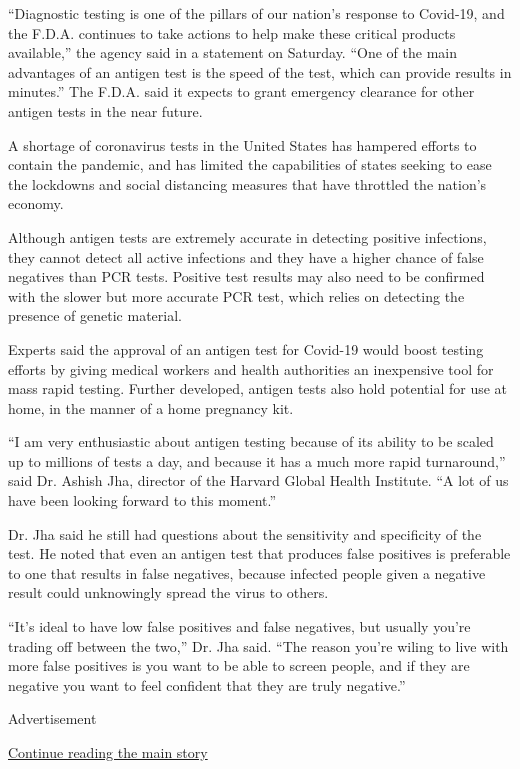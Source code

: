 ``Diagnostic testing is one of the pillars of our nation's response to
Covid-19, and the F.D.A. continues to take actions to help make these
critical products available,'' the agency said in a statement on
Saturday. ``One of the main advantages of an antigen test is the speed
of the test, which can provide results in minutes.'' The F.D.A. said it
expects to grant emergency clearance for other antigen tests in the near
future.

A shortage of coronavirus tests in the United States has hampered
efforts to contain the pandemic, and has limited the capabilities of
states seeking to ease the lockdowns and social distancing measures that
have throttled the nation's economy.

Although antigen tests are extremely accurate in detecting positive
infections, they cannot detect all active infections and they have a
higher chance of false negatives than PCR tests. Positive test results
may also need to be confirmed with the slower but more accurate PCR
test, which relies on detecting the presence of genetic material.

Experts said the approval of an antigen test for Covid-19 would boost
testing efforts by giving medical workers and health authorities an
inexpensive tool for mass rapid testing. Further developed, antigen
tests also hold potential for use at home, in the manner of a home
pregnancy kit.

``I am very enthusiastic about antigen testing because of its ability to
be scaled up to millions of tests a day, and because it has a much more
rapid turnaround,'' said Dr. Ashish Jha, director of the Harvard Global
Health Institute. ``A lot of us have been looking forward to this
moment.''

Dr. Jha said he still had questions about the sensitivity and
specificity of the test. He noted that even an antigen test that
produces false positives is preferable to one that results in false
negatives, because infected people given a negative result could
unknowingly spread the virus to others.

``It's ideal to have low false positives and false negatives, but
usually you're trading off between the two,'' Dr. Jha said. ``The reason
you're wiling to live with more false positives is you want to be able
to screen people, and if they are negative you want to feel confident
that they are truly negative.''

Advertisement

\protect\hyperlink{after-bottom}{Continue reading the main story}

